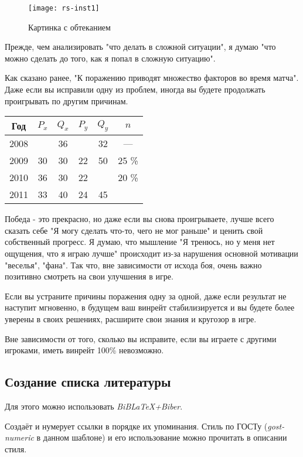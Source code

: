 \begin{wrapfigure}{l}{0.5\linewidth}
	\texttt{[image: rs-inst1]}
	\caption{Картинка с обтеканием}
\end{wrapfigure}
Прежде, чем анализировать "что делать в сложной ситуации", я думаю "что можно сделать до того, как я попал в сложную ситуацию". 

Как сказано ранее, "К поражению приводят множество факторов во время матча". Даже если вы исправили одну из проблем, иногда вы будете продолжать проигрывать по другим причинам.

\begin{wraptable}{r}{0.5\linewidth}
	\centering
	\begin{tabular}{|c|c|c|c|c|c|}
		\hline
		Год & $P_x$ &$Q_x$ & $P_y$ & $Q_y$ & $n$\\ \hline
		2008 &  & 36 &  & 32 & — \\ \hline
		2009 & 30 & 30 & 22 & 50 & 25 \% \\ \hline
		2010 & 36 & 30 & 22 &  & 20 \% \\ \hline
		2011 & 33 & 40 & 24 & 45 & \\ \hline
	\end{tabular}
\end{wraptable}
Победа - это прекрасно, но даже если вы снова проигрываете, лучше всего сказать себе "Я могу сделать что-то, чего не мог раньше" и ценить свой собственный прогресс.
Я думаю, что мышление "Я тренюсь, но у меня нет ощущения, что я играю лучше" происходит из-за нарушения основной мотивации "веселья", "фана". Так что, вне зависимости от исхода боя, очень важно позитивно смотреть на свои улучшения в игре.

Если вы устраните причины поражения одну за одной, даже если результат не наступит мгновенно, в будущем ваш винрейт стабилизируется и вы будете более уверены в своих решениях, расширите свои знания и кругозор в игре.

Вне зависимости от того, сколько вы исправите, если вы играете с другими игроками, иметь винрейт 100\% невозможно.

\subsection{Создание списка литературы}

Для этого можно использовать \emph{BiBLaTeX+Biber}.\cite{biblatex}

Создаёт и нумерует ссылки в порядке их упоминания.\cite{modelcheck} Стиль по ГОСТу (\emph{gost-numeric} в данном шаблоне) и его использование можно прочитать в описании стиля.\cite{gost}
